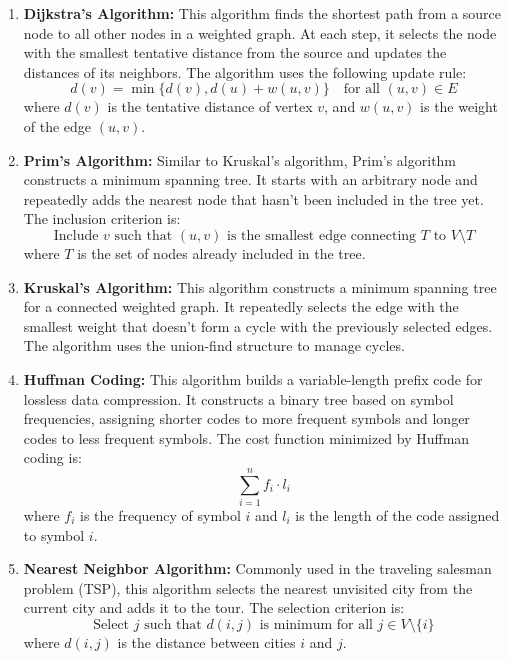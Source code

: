 \documentclass[
]{article}
\begin{document}
\begin{enumerate}
    \item \textbf{Dijkstra’s Algorithm:} This algorithm finds the shortest path from a source node to all other nodes in a weighted graph. At each step, it selects the node with the smallest tentative distance from the source and updates the distances of its neighbors. The algorithm uses the following update rule:
    \[
    d(v) = \min \{ d(v), d(u) + w(u, v) \} \quad \text{for all } (u, v) \in E
    \]
    where \(d(v)\) is the tentative distance of vertex \(v\), and \(w(u, v)\) is the weight of the edge \((u, v)\).

    \item \textbf{Prim’s Algorithm:} Similar to Kruskal’s algorithm, Prim’s algorithm constructs a minimum spanning tree. It starts with an arbitrary node and repeatedly adds the nearest node that hasn’t been included in the tree yet. The inclusion criterion is:
    \[
    \text{Include } v \text{ such that } (u, v) \text{ is the smallest edge connecting } T \text{ to } V \setminus T
    \]
    where \(T\) is the set of nodes already included in the tree.

    \item \textbf{Kruskal’s Algorithm:} This algorithm constructs a minimum spanning tree for a connected weighted graph. It repeatedly selects the edge with the smallest weight that doesn’t form a cycle with the previously selected edges. The algorithm uses the union-find structure to manage cycles.

    \item \textbf{Huffman Coding:} This algorithm builds a variable-length prefix code for lossless data compression. It constructs a binary tree based on symbol frequencies, assigning shorter codes to more frequent symbols and longer codes to less frequent symbols. The cost function minimized by Huffman coding is:
    \[
    \sum_{i=1}^n f_i \cdot l_i
    \]
    where \(f_i\) is the frequency of symbol \(i\) and \(l_i\) is the length of the code assigned to symbol \(i\).

    \item \textbf{Nearest Neighbor Algorithm:} Commonly used in the traveling salesman problem (TSP), this algorithm selects the nearest unvisited city from the current city and adds it to the tour. The selection criterion is:
    \[
    \text{Select } j \text{ such that } d(i, j) \text{ is minimum for all } j \in V \setminus \{i\}
    \]
    where \(d(i, j)\) is the distance between cities \(i\) and \(j\).
\end{enumerate}
\end{document}

